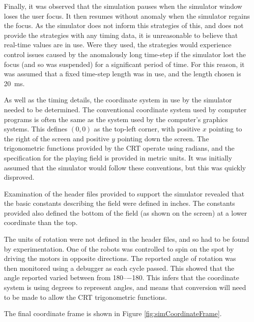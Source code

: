 \documentclass[10pt]{article}
\begin{document}
Finally, it was observed that the simulation pauses when the simulator window
loses the user focus.  It then resumes without anomaly when the simulator
regains the focus.  As the simulator does not inform this strategies of this,
and does not provide the strategies with any timing data, it is unreasonable to
believe that real-time values are in use.  Were they used, the strategies would
experience control issues caused by the anomalously long time-step if the
simulator lost the focus (and so was suspended) for a significant period of
time.  For this reason, it was assumed that a fixed time-step length was in use,
and the length chosen is \SI{20}{\milli\second}.

As well as the timing details, the coordinate system in use by the simulator
needed to be determined.  The conventional coordinate system used by computer
programs is often the same as the system used by the computer's graphics
systems. This defines $\left(0,0\right)$ as the top-left corner, with positive
$x$ pointing to the right of the screen and positive $y$ pointing down the
screen. The trigonometric functions provided by the CRT operate using
radians, and the specification for the playing field is provided in metric
units.  It was initially assumed that the simulator would follow these
conventions, but this was quickly disproved.

Examination of the header files provided to support the simulator revealed that
the basic constants describing the field were defined in inches. The constants
provided also defined the bottom of the field (as shown on the screen) at a
lower coordinate than the top.

The units of rotation were not defined in the header files, and so had to be
found by experimentation.  One of the robots was controlled to spin on the spot
by driving the motors in opposite directions.  The reported angle of rotation
was then monitored using a debugger as each cycle passed.  This showed that the
angle reported varied between from \numrange{+180}{-180}.  This infers that the
coordinate system is using degrees to represent angles, and means that
conversion will need to be made to allow the CRT trigonometric functions.

The final coordinate frame is shown in Figure \ref{fig:simCoordinateFrame}.
\end{document}
